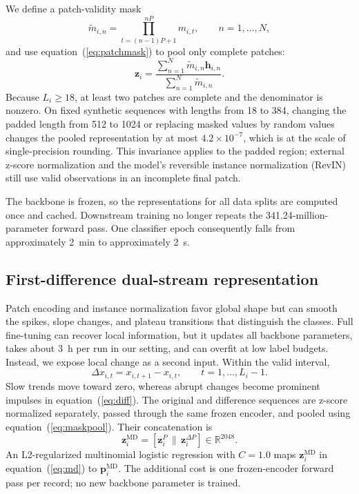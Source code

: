 \documentclass{iopjournal}
\begin{document}
We define a patch-validity mask
\begin{equation}
\tilde{m}_{i,n}=\prod_{t=(n-1)P+1}^{nP}m_{i,t},\qquad n=1,\ldots,N,
\label{eq:patchmask}
\end{equation}
and use equation~(\ref{eq:patchmask}) to pool only complete patches:
\begin{equation}
\bm{z}_i=\frac{\sum_{n=1}^{N}\tilde{m}_{i,n}\bm{h}_{i,n}}{\sum_{n=1}^{N}\tilde{m}_{i,n}}.
\label{eq:maskpool}
\end{equation}
Because $L_i\ge18$, at least two patches are complete and the denominator is nonzero. On fixed synthetic sequences with lengths from 18 to 384, changing the padded length from 512 to 1024 or replacing masked values by random values changes the pooled representation by at most $4.2\times10^{-7}$, which is at the scale of single-precision rounding. This invariance applies to the padded region; external z-score normalization and the model's reversible instance normalization (RevIN)~\cite{kim2022} still use valid observations in an incomplete final patch.

The backbone is frozen, so the representations for all data splits are computed once and cached. Downstream training no longer repeats the 341.24-million-parameter forward pass. One classifier epoch consequently falls from approximately 2~min to approximately 2~s.

\subsection{First-difference dual-stream representation}\label{sec:dual}

Patch encoding and instance normalization favor global shape but can smooth the spikes, slope changes, and plateau transitions that distinguish the classes. Full fine-tuning can recover local information, but it updates all backbone parameters, takes about 3~h per run in our setting, and can overfit at low label budgets. Instead, we expose local change as a second input. Within the valid interval,
\begin{equation}
\Delta x_{i,t}=x_{i,t+1}-x_{i,t},\qquad t=1,\ldots,L_i-1.
\label{eq:diff}
\end{equation}
Slow trends move toward zero, whereas abrupt changes become prominent impulses in equation~(\ref{eq:diff}). The original and difference sequences are z-score normalized separately, passed through the same frozen encoder, and pooled using equation~(\ref{eq:maskpool}). Their concatenation is
\begin{equation}
\bm{z}_i^{\mathrm{MD}}=\left[\bm{z}_i^{P}\,\|\,\bm{z}_i^{\Delta P}\right]\in\mathbb{R}^{2048}.
\label{eq:md}
\end{equation}
An L2-regularized multinomial logistic regression with $C=1.0$ maps $\bm{z}_i^{\mathrm{MD}}$ in equation~(\ref{eq:md}) to $\bm{p}_i^{\mathrm{MD}}$. The additional cost is one frozen-encoder forward pass per record; no new backbone parameter is trained.
\end{document}
